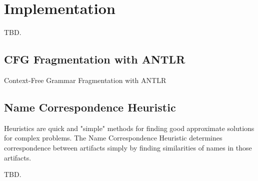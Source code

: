 \chapter{Implementation}
TBD.

\section{CFG Fragmentation with ANTLR}
Context-Free Grammar Fragmentation with ANTLR

\section{Name Correspondence Heuristic}


Heuristics are quick and "simple" methods for finding good approximate solutions for complex problems.
The Name Correspondence Heuristic determines correspondence between artifacts simply by finding similarities of names in those artifacts. 

TBD.